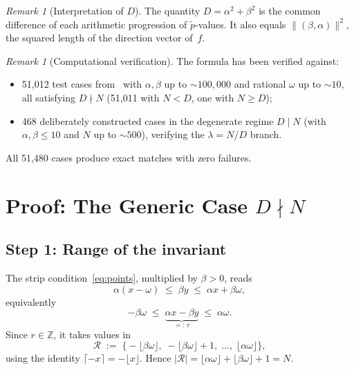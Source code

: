 \documentclass[11pt]{article}
\theoremstyle{plain}
\theoremstyle{definition}
\theoremstyle{remark}
\newtheorem{remark}[theorem]{Remark}
\begin{document}
\begin{remark}[Interpretation of $D$]\label{rem:D}
The quantity $D = \alpha^2+\beta^2$ is the common difference of each
arithmetic progression of $\tilde{p}$-values.
It also equals $\lVert(\beta,\alpha)\rVert^2$, the squared length of the
direction vector of~$f$.
\end{remark}

\begin{remark}[Computational verification]\label{rem:verification}
The formula has been verified against:
\begin{itemize}
    \item 51{,}012 test cases from~\cite{Kunert2025} with
          $\alpha, \beta$ up to ${\sim}100{,}000$ and rational $\omega$
          up to ${\sim}10$, all satisfying $D \nmid N$
          (51{,}011 with $N < D$, one with $N \ge D$);
    \item 468 deliberately constructed cases in the degenerate regime
          $D \mid N$ (with $\alpha, \beta \le 10$ and $N$ up to
          ${\sim}500$), verifying the $\lambda = N/D$ branch.
\end{itemize}
All 51{,}480 cases produce exact matches with zero failures.
\end{remark}

\section{Proof: The Generic Case $D \nmid N$}\label{sec:proof}

\subsection{Step 1: Range of the invariant}\label{subsec:step1}

The strip condition~\eqref{eq:points}, multiplied by $\beta > 0$, reads
\[
    \alpha(x - \omega) \;\le\; \beta y \;\le\; \alpha x + \beta\omega,
\]
equivalently
\begin{equation}\label{eq:r_range}
    -\beta\omega \;\le\;
    \underbrace{\alpha x - \beta y}_{=:\,r}
    \;\le\; \alpha\omega.
\end{equation}
Since $r \in \mathbb{Z}$, it takes values in
\begin{equation}\label{eq:R}
    \mathcal{R} \;:=\;
    \bigl\{-\lfloor\beta\omega\rfloor,\;
    -\lfloor\beta\omega\rfloor + 1,\; \ldots,\;
    \lfloor\alpha\omega\rfloor\bigr\},
\end{equation}
using the identity $\lceil{-x}\rceil = -\lfloor x \rfloor$.
Hence $|\mathcal{R}| = \lfloor\alpha\omega\rfloor + \lfloor\beta\omega\rfloor
+ 1 = N$.
\end{document}
